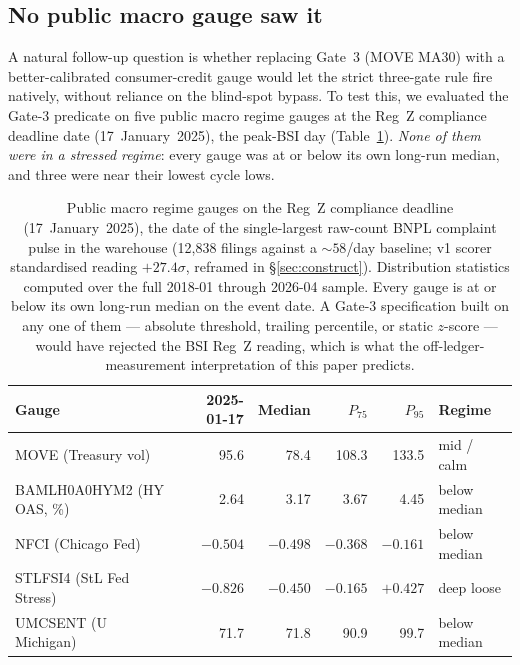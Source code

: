 \documentclass[11pt,letterpaper]{article}
\begin{document}
\subsection{No public macro gauge saw it}
\label{sec:macroblind}

A natural follow-up question is whether replacing Gate~3 (MOVE MA30)
with a better-calibrated consumer-credit gauge would let the strict
three-gate rule fire natively, without reliance on the blind-spot
bypass. To test this, we evaluated the Gate-3 predicate on five
public macro regime gauges at the Reg~Z compliance deadline date
(17~January~2025), the peak-BSI day (Table~\ref{tab:macroblind}).
\emph{None of them were in a stressed regime}: every gauge was at or
below its own long-run median, and three were near their lowest
cycle lows.

\begin{table}[H]
\centering
\small
\begin{tabular}{lrrrrl}
\toprule
\textbf{Gauge} & \textbf{2025-01-17} & \textbf{Median} &
\textbf{$P_{75}$} & \textbf{$P_{95}$} & \textbf{Regime}\\
\midrule
MOVE (Treasury vol)        & 95.6    & 78.4    & 108.3   & 133.5   & mid / calm\\
BAMLH0A0HYM2 (HY OAS, \%)  & 2.64    & 3.17    & 3.67    & 4.45    & below median\\
NFCI (Chicago Fed)         & $-0.504$ & $-0.498$ & $-0.368$ & $-0.161$ & below median\\
STLFSI4 (StL Fed Stress)   & $-0.826$ & $-0.450$ & $-0.165$ & $+0.427$ & deep loose\\
UMCSENT (U Michigan)       & 71.7    & 71.8    & 90.9    & 99.7    & below median\\
\bottomrule
\end{tabular}
\caption{Public macro regime gauges on the Reg~Z compliance deadline
(17~January~2025), the date of the single-largest raw-count BNPL
complaint pulse in the warehouse (12{,}838 filings against a $\sim\!58$/day
baseline; v1 scorer standardised reading $+27.4\sigma$, reframed in
\S\ref{sec:construct}). Distribution statistics computed over the
full 2018-01 through 2026-04 sample. Every gauge is at or below its
own long-run median on the event date. A Gate-3 specification built
on any one of them --- absolute threshold, trailing percentile, or
static $z$-score --- would have rejected the BSI Reg~Z reading, which
is what the off-ledger-measurement interpretation of this paper
predicts.}
\label{tab:macroblind}
\end{table}
\end{document}
